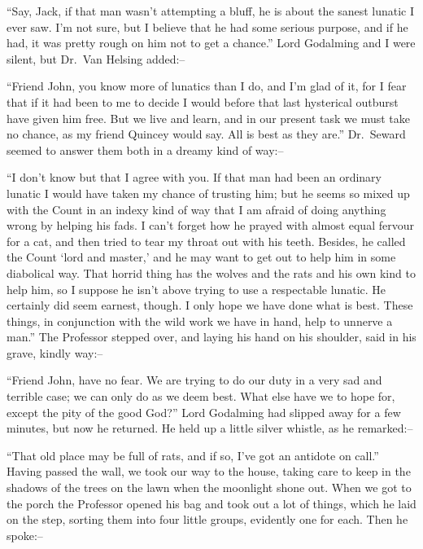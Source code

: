 \documentclass[12pt,openright]{book}
\begin{document}
“Say, Jack, if that man wasn’t attempting a bluff, he is about the sanest lunatic I ever saw. I’m not sure, but I believe that he had some serious purpose, and if he had, it was pretty rough on him not to get a chance.” Lord Godalming and I were silent, but Dr. Van Helsing added:–

“Friend John, you know more of lunatics than I do, and I’m glad of it, for I fear that if it had been to me to decide I would before that last hysterical outburst have given him free. But we live and learn, and in our present task we must take no chance, as my friend Quincey would say. All is best as they are.” Dr. Seward seemed to answer them both in a dreamy kind of way:–

“I don’t know but that I agree with you. If that man had been an ordinary lunatic I would have taken my chance of trusting him; but he seems so mixed up with the Count in an indexy kind of way that I am afraid of doing anything wrong by helping his fads. I can’t forget how he prayed with almost equal fervour for a cat, and then tried to tear my throat out with his teeth. Besides, he called the Count ‘lord and master,’ and he may want to get out to help him in some diabolical way. That horrid thing has the wolves and the rats and his own kind to help him, so I suppose he isn’t above trying to use a respectable lunatic. He certainly did seem earnest, though. I only hope we have done what is best. These things, in conjunction with the wild work we have in hand, help to unnerve a man.” The Professor stepped over, and laying his hand on his shoulder, said in his grave, kindly way:–

“Friend John, have no fear. We are trying to do our duty in a very sad and terrible case; we can only do as we deem best. What else have we to hope for, except the pity of the good God?” Lord Godalming had slipped away for a few minutes, but now he returned. He held up a little silver whistle, as he remarked:–

“That old place may be full of rats, and if so, I’ve got an antidote on call.” Having passed the wall, we took our way to the house, taking care to keep in the shadows of the trees on the lawn when the moonlight shone out. When we got to the porch the Professor opened his bag and took out a lot of things, which he laid on the step, sorting them into four little groups, evidently one for each. Then he spoke:–
\end{document}
